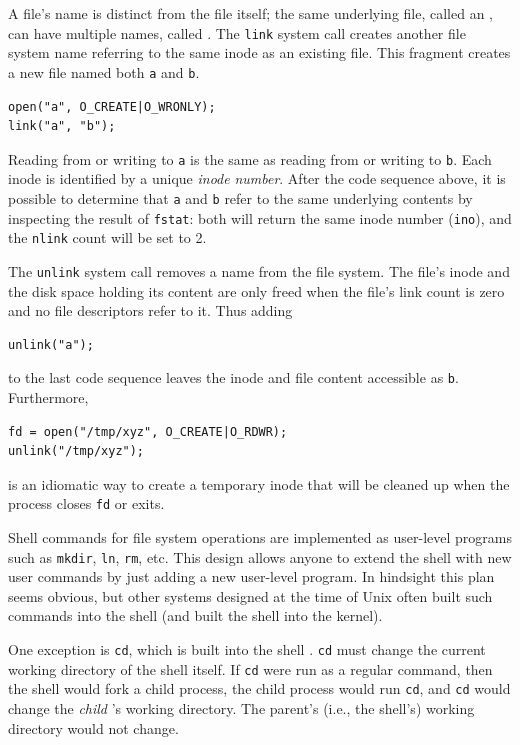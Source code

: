 A file's name is distinct from the file itself;
the same underlying file, called an 
, 
can have multiple names,
called 
.
The
\lstinline{link}
system call creates another file system name 
referring to the same inode as an existing file.
This fragment creates a new file named both
\lstinline{a}
and
\lstinline{b}.
\begin{lstlisting}[]
open("a", O_CREATE|O_WRONLY);
link("a", "b");
\end{lstlisting}
Reading from or writing to
\lstinline{a}
is the same as reading from or writing to
\lstinline{b}.
Each inode is identified by a unique
\textit{inode}
\textit{number}.
After the code sequence above, it is possible
to determine that
\lstinline{a}
and
\lstinline{b}
refer to the same underlying contents by inspecting the
result of 
\lstinline{fstat}:
both will return the same inode number 
(\lstinline{ino}),
and the
\lstinline{nlink}
count will be set to 2.

The
\lstinline{unlink}
system call removes a name from the file system.
The file's inode and the disk space holding its content
are only freed when the file's link count is zero and
no file descriptors refer to it.
Thus adding
\begin{lstlisting}[]
unlink("a");
\end{lstlisting}
to the last code sequence leaves the inode
and file content accessible as
\lstinline{b}.
Furthermore,
\begin{lstlisting}[]
fd = open("/tmp/xyz", O_CREATE|O_RDWR);
unlink("/tmp/xyz");
\end{lstlisting}
is an idiomatic way to create a temporary inode 
that will be cleaned up when the process closes 
\lstinline{fd}
or exits.

Shell commands for file system operations are implemented
as user-level programs such as
\lstinline{mkdir},
\lstinline{ln},
\lstinline{rm},
etc. This design allows anyone to extend the shell with new user commands by
just adding a new user-level program.  In hindsight this plan seems obvious,
but other systems designed at the time of Unix often built such commands into
the shell (and built the shell into the kernel).

One exception is
\lstinline{cd},
which is built into the shell
.
\lstinline{cd}
must change the current working directory of the
shell itself.  If
\lstinline{cd}
were run as a regular command, then the shell would fork a child
process, the child process would run
\lstinline{cd},
and
\lstinline{cd}
would change the 
\textit{child} 's 
working directory.  The parent's (i.e.,
the shell's) working directory would not change.
